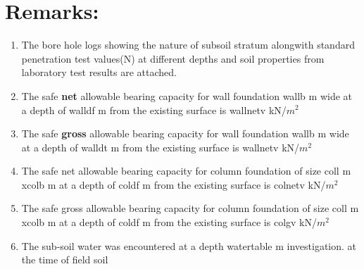 \documentclass{soil12}
\begin{document}
\section{Remarks:}
\begin{enumerate}
\item{The bore hole logs showing the nature of subsoil stratum alongwith standard
penetration test values(N) at different depths and soil properties from laboratory test
results are attached.}
\item{The safe \textbf{net} allowable bearing capacity for wall foundation {{wallb}} m wide at a depth of
{{walldf}} m from the existing surface is {{wallnetv}} kN/$m^2$}
\item{The safe \textbf{gross} allowable bearing capacity for wall foundation {{wallb}} m wide at a depth of
{{walldt}} m from the existing surface is {{wallnetv}} kN/$m^2$}
\item{The safe net allowable bearing capacity for column foundation of size {{coll}} m x{{colb}} m at a
depth of {{coldf}} m from the existing surface is {{colnetv}} kN/$m^2$}
\item{The safe gross allowable bearing capacity for column foundation of size {{coll}} m x{{colb}} m
at a depth of {{coldf}} m from the existing surface is {{colgv}} kN/$m^2$}
\item{The sub-soil water was encountered at a depth {{watertable}} m investigation. at the time of field soil}

\end{enumerate}




\end{document}
